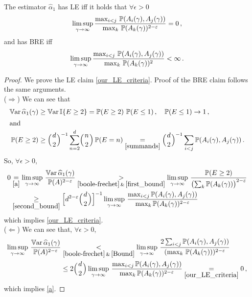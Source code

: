 \begin{proposition} \label{prop:efficiency}
	The estimator $\hat{\alpha}_1$ has LE iff it holds that $\forall \epsilon > 0$
	\begin{equation}\label{our_LE_criteria}
	  \limsup_{\gamma\to\infty}
		\dfrac{\max_{i < j} \, \operatorname{{\mathbb P}}(A_i(\gamma), A_j(\gamma))}{\max_k \, \operatorname{{\mathbb P}}(A_k(\gamma))^{2-\varepsilon}} = 0 \,,
	\end{equation}
	and has BRE iff
	\begin{equation}\label{our_BRE_criteria}
	  \limsup_{\gamma\to\infty}
		\dfrac{\max_{i < j} \, \operatorname{{\mathbb P}}(A_i(\gamma), A_j(\gamma))}{\max_k \, \operatorname{{\mathbb P}}(A_k(\gamma))^2} < \infty \,.
	\end{equation}
\end{proposition}
\begin{proof}
	We prove the LE claim \eqref{our_LE_criteria}. Proof of the BRE claim follows the same arguments. \\
	($\Rightarrow$) We can see that
	\begin{align}
		\Var \hat{\alpha}_1(\gamma) &\ge \Var \ind{E \ge 2} = \Prob(E \ge 2) \, \Prob(E \le 1) \,, \quad \Prob(E \le 1)\to1 \,,  \label{first_bound} \\
	\intertext{and}
		\Prob(E \ge 2) &\ge \BigBinom{d}{2}^{-1} \sum_{n=2}^d \BigBinom{n}{2} \Prob(E = n) \underset{\eqref{summands}}{=} \BigBinom{d}{2}^{-1} \sum_{i<j} \Prob(A_i(\gamma), A_j(\gamma)) \label{second_bound} \,.
	\end{align}
	So, $\forall \epsilon > 0$,
	\begin{align*}
		0 &\underset{\eqref{a}}{=} \limsup_{\gamma\to\infty}\,\frac{\Var\hat{\alpha}_1(\gamma)}{\Prob(A)^{2-\epsilon}}
		\underset{\eqref{boole-frechet} \,\&\,\eqref{first_bound}}{>} \limsup_{\gamma\to\infty}\,\frac{\Prob(E \ge 2)}{\bigl(\sum_k \Prob(A_k(\gamma))\bigr)^{2-\epsilon}} \\
		&\underset{\eqref{second_bound}}{\ge} \Bigl[ d^{2-\epsilon} \BigBinom{d}{2} \Bigr]^{-1} \limsup_{\gamma\to\infty}\,\frac{\max_{i < j}\Prob(A_i(\gamma), A_j(\gamma))}{\max_k
		 \Prob(A_k(\gamma))^{2-\epsilon}}
	\end{align*}
	which implies \eqref{our_LE_criteria}. \\
	($\Leftarrow$) We can see that, $\forall \epsilon > 0$,
	\begin{align*}
		\limsup_{\gamma\to\infty}\,\frac{\Var\hat{\alpha}_1(\gamma)}{\Prob(A)^{2-\epsilon}}
		&\underset{\eqref{boole-frechet} \,\&\, \eqref{Bound}}{<} \limsup_{\gamma\to\infty}\,\frac{2 \sum_{i<j}\Prob(A_i(\gamma), A_j(\gamma))}
		{(\max_k \, \Prob(A_k(\gamma)))^{2-\epsilon}} \\
		&\le 2\BigBinom{d}{2} \limsup_{\gamma\to\infty}\,\frac{\max_{i < j}
		 \Prob(A_i(\gamma), A_j(\gamma))}
		{\max_k \Prob(A_k(\gamma))^{2-\epsilon}}
		\underset{\eqref{our_LE_criteria}}{=} 0 \,,
	\end{align*}
	which implies \eqref{a}.
\end{proof}


